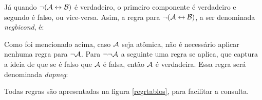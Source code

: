 Já quando  $\neg(\mathcal{A} \leftrightarrow \mathcal{B})$ é verdadeiro, o primeiro componente é verdadeiro e segundo é falso, ou vice-versa.
Asim, a regra para $\neg(\mathcal{A} \leftrightarrow \mathcal{B})$, a ser denominada \emph{negbicond}, é:


Como foi mencionado acima, caso $\mathcal{A}$ seja atômica, não é necessário aplicar nenhuma regra para $\neg\mathcal{A}$.
Para $\neg \neg \mathcal{A}$ a seguinte uma regra se aplica, que captura a ideia de que se é falso que $\mathcal{A}$ é falsa, então $\mathcal{A}$ é verdadeira.
Essa regra será denominada \emph{dupneg}:


Todas regras são apresentadas na figura \ref{regrtablos}, para facilitar a consulta.

